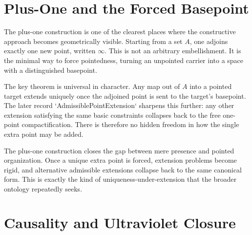 \documentclass[11pt,a4paper]{book}
\begin{document}
\section{Plus-One and the Forced Basepoint}

The plus-one construction is one of the clearest places where the constructive approach becomes geometrically visible. Starting from a set $A$, one adjoins exactly one new point, written $\infty$. This is not an arbitrary embellishment. It is the minimal way to force pointedness, turning an unpointed carrier into a space with a distinguished basepoint.

The key theorem is universal in character. Any map out of $A$ into a pointed target extends uniquely once the adjoined point is sent to the target's basepoint. The later record `AdmissiblePointExtension` sharpens this further: any other extension satisfying the same basic constraints collapses back to the free one-point compactification. There is therefore no hidden freedom in how the single extra point may be added.

\begin{center}
\end{center}

The plus-one construction closes the gap between mere presence and pointed organization. Once a unique extra point is forced, extension problems become rigid, and alternative admissible extensions collapse back to the same canonical form. This is exactly the kind of uniqueness-under-extension that the broader ontology repeatedly seeks.

\section{Causality and Ultraviolet Closure}
\end{document}
